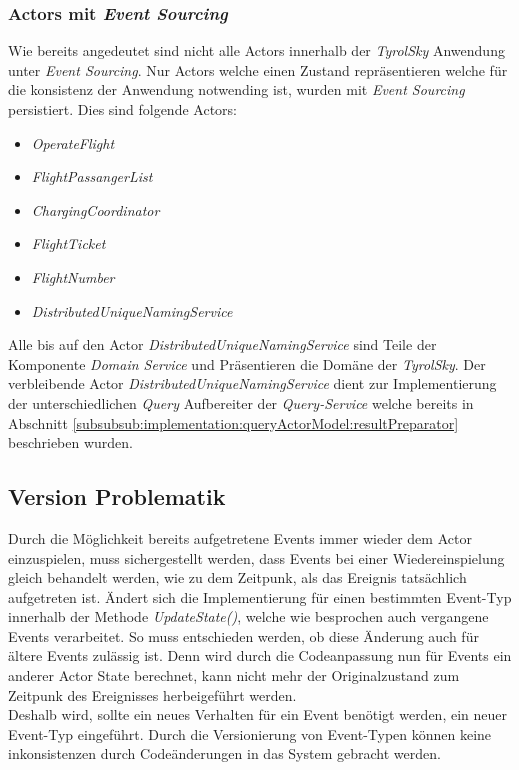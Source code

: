 \subsubsection{Actors mit \textit{Event Sourcing}}
Wie bereits angedeutet sind nicht alle Actors innerhalb der \textit{TyrolSky} Anwendung unter \textit{Event Sourcing}. Nur Actors welche einen Zustand repräsentieren welche für die konsistenz der Anwendung notwending ist, wurden mit \textit{Event Sourcing} persistiert. Dies sind folgende Actors: 
\begin{itemize}
    \item{\textit{OperateFlight}}
    \item{\textit{FlightPassangerList}}
    \item{\textit{ChargingCoordinator}}
    \item{\textit{FlightTicket}}
    \item{\textit{FlightNumber}}
    \item{\textit{DistributedUniqueNamingService}}
\end{itemize}
Alle bis auf den Actor \textit{DistributedUniqueNamingService} sind Teile der Komponente \textit{Domain Service} und Präsentieren die Domäne der \textit{TyrolSky}. Der verbleibende Actor \textit{DistributedUniqueNamingService} dient zur Implementierung der unterschiedlichen \textit{Query} Aufbereiter der \textit{Query-Service} welche bereits in Abschnitt \ref{subsubsub:implementation:queryActorModel:resultPreparator} beschrieben wurden.

\subsection{Version Problematik}
Durch die Möglichkeit bereits aufgetretene Events immer wieder dem Actor einzuspielen, muss sichergestellt werden, dass Events bei einer Wiedereinspielung gleich behandelt werden, wie zu dem Zeitpunk, als das Ereignis tatsächlich aufgetreten ist. Ändert sich die Implementierung für einen bestimmten Event-Typ innerhalb der Methode \textit{UpdateState()}, welche wie besprochen auch vergangene Events verarbeitet. So muss entschieden werden, ob diese Änderung auch für ältere Events zulässig ist. Denn wird durch die Codeanpassung nun für Events ein anderer Actor State berechnet, kann nicht mehr der Originalzustand zum Zeitpunk des Ereignisses herbeigeführt werden. \\
Deshalb wird, sollte ein neues Verhalten für ein Event benötigt werden, ein neuer Event-Typ eingeführt. Durch die Versionierung von Event-Typen können keine inkonsistenzen durch Codeänderungen in das System gebracht werden. 

